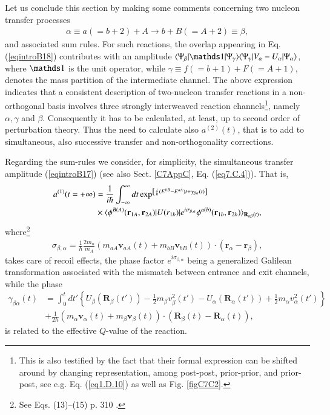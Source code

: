 \begin{subappendices}
 Let us conclude this section by making some comments concerning two nucleon transfer processes
 \begin{align}
 \alpha\equiv a (=b+2)+A\rightarrow b+B(=A+2)\equiv\beta,
 \end{align}
 and associated sum rules.
 For such reactions, the overlap appearing in Eq. (\ref{eqintroB18}) 
 contributes with an amplitude $\braket{\Psi_\beta|\idop|\Psi_\gamma}\braket{\Psi_\gamma|V_\alpha-U_\alpha|\Psi_\alpha}$, where $\idop$ is the unit operator, while $\gamma\equiv f(=b+1)+F(=A+1)$, denotes the mass partition of the intermediate channel. 
 The above expression indicates that a consistent description of two-nucleon transfer reactions in a non-orthogonal basis involves  three strongly interweaved  reaction channels\footnote{This is also testified by the fact that their formal expression can be shifted around by changing representation, among  post-post, prior-prior, and prior-post, see e.g. Eq. (\ref{eq1.D.10}) as well as Fig. \ref{figC7C2}.}, namely $\alpha,\gamma$ and $\beta$. Consequently it has to be calculated, at least, up to second order of perturbation theory. Thus the need to calculate also $a^{(2)}(t)$,  that is to add to simultaneous, also successive transfer and non-orthogonality corrections.
 
 Regarding the sum-rules  we consider,  for simplicity, the simultaneous transfer amplitude (\ref{eqintroB17}) (see also Sect. \ref{C7AppC}, Eq. (\ref{eq7.C.4})). That is,
 \begin{align}\label{eqintroB19}
 \nonumber a^{(1)}(t=+\infty)&=\frac{1}{i\hbar}\int^{\infty}_{-\infty}dt\exp^{\left[\frac{i}{\hbar}(E^{bB}-E^{aA})t+\gamma_{\beta\alpha}(t)\right]}\\
 &\times\langle {\phi^{B(A)}(\mathbf r_{1A},\mathbf r_{2A})|U(r_{1b})|e^{i\sigma_{\beta,\alpha}}\phi^{a(b)}(\mathbf r_{1b},\mathbf r_{2b})} \rangle_{\mathbf R_{\alpha\beta}(t)},
 \end{align}
 where\footnote{See Eqs. (13)--(15) p. 310 \cite{Broglia:04a}.}
 \begin{align}
 \sigma_{\beta,\alpha}=\frac{1}{\hbar}\frac{2m_n}{m_A}(m_{aA}\mathbf v_{aA}(t)+m_{bB}\mathbf v_{bB}(t))\cdot(\mathbf r_\alpha-\mathbf r_\beta),
 \end{align}
 takes care of recoil effects, the phase factor $e^{i\sigma_{\beta,\alpha}}$ being a generalized Galilean transformation associated with the mismatch between entrance and exit channels,  while the phase
 \begin{align}\label{eqintroB21}
 \nonumber\gamma_{\beta\alpha}(t)&=\int^t_0 dt'\left\{U_\beta(\mathbf R_{\beta}(t'))-\frac{1}{2}m_\beta v_\beta^2(t')-U_\alpha(\mathbf R_\alpha(t'))+\frac{1}{2}m_\alpha v_\alpha^2(t')\right\}\\
 &+\frac{1}{2\hbar}\left(m_\alpha \mathbf v_\alpha(t)+m_\beta \mathbf v_\beta(t) \right)\cdot(\mathbf R_\beta(t)-\mathbf R_\alpha(t)),
 \end{align}
 is related to the effective $Q$-value of the reaction.
 

\end{subappendices}
